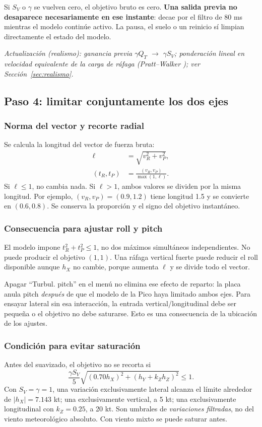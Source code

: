 Si $S_V$ o $\gamma$ se vuelven cero, el objetivo bruto es cero. \textbf{Una salida previa no desaparece necesariamente en ese instante}: decae por el filtro de 80 ms mientras el modelo continúe activo. La pausa, el suelo o un reinicio sí limpian directamente el estado del modelo.

\textit{Actualización (realismo): ganancia previa $\gamma Q_T$ $\rightarrow$ $\gamma S_V$; ponderación lineal en velocidad equivalente de la carga de ráfaga (Pratt--Walker \cite{pratt1954}); ver Sección~\ref{sec:realismo}.}

\subsection{Paso 4: limitar conjuntamente los dos ejes}
\subsubsection{Norma del vector y recorte radial}
Se calcula la longitud del vector de fuerza bruta:
\begin{align}
\ell&=\sqrt{v_R^2+v_P^2},\\
(t_R,t_P)&=\frac{(v_R,v_P)}{\max(1,\ell)}.
\label{eq:turb-limit}
\end{align}
Si $\ell\le1$, no cambia nada. Si $\ell>1$, ambos valores se dividen por la misma longitud. Por ejemplo, $(v_R,v_P)=(0.9,1.2)$ tiene longitud 1.5 y se convierte en $(0.6,0.8)$. Se conserva la proporción y el signo del objetivo instantáneo.

\subsubsection{Consecuencia para ajustar roll y pitch}
El modelo impone $t_R^2+t_P^2\le1$, no dos máximos simultáneos independientes. No puede producir el objetivo $(1,1)$. Una ráfaga vertical fuerte puede reducir el roll disponible aunque $h_X$ no cambie, porque aumenta $\ell$ y se divide todo el vector.

Apagar ``Turbul. pitch'' en el menú no elimina ese efecto de reparto: la placa anula pitch \emph{después} de que el modelo de la Pico haya limitado ambos ejes. Para ensayar lateral sin esa interacción, la entrada vertical/longitudinal debe ser pequeña o el objetivo no debe saturarse. Esto es una consecuencia de la ubicación de los ajustes.

\subsubsection{Condición para evitar saturación}
Antes del suavizado, el objetivo no se recorta si
\begin{equation}
\frac{\gamma S_V}{5}
\sqrt{(0.70h_X)^2+(h_Y+k_Zh_Z)^2}\le1.
\end{equation}
Con $S_V=\gamma=1$, una variación exclusivamente lateral alcanza el límite alrededor de $|h_X|=7.143$ kt; una exclusivamente vertical, a 5 kt; una exclusivamente longitudinal con $k_Z=0.25$, a 20 kt. Son umbrales de \emph{variaciones filtradas}, no del viento meteorológico absoluto. Con viento mixto se puede saturar antes.

